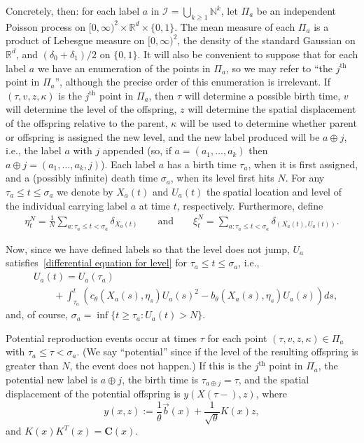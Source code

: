 \documentclass[EJP]{ejpecp} %
\newcommand{\IR}{\mathbb R}
\newcommand{\IN}{\mathbb N}
\newcommand{\meanq}{\vec b}    %
\newcommand{\covq}{\mathbf{C}}     %
\newcommand{\lp}{\xi}              %
\newcommand{\labelspace}{\mathcal{I}} %
\newcommand{\concat}{\oplus}   %
\begin{document}
Concretely, then: for each label $a$ in
$\labelspace = \bigcup_{k \ge 1} \IN^k$,
let $\Pi_a$ be an independent Poisson process on 
$[0, \infty)^2 \times \IR^d \times \{0,1\}$.
The mean measure of each $\Pi_a$ is a product of Lebesgue measure on $[0, \infty)^2$,
the density of the standard Gaussian on $\IR^d$, and 
$(\delta_0 + \delta_1)/2$ on $\{0, 1\}$.
It will also be convenient
to suppose that for each label $a$ we have an enumeration of the points in $\Pi_a$,
so we may refer to ``the $j^\text{th}$ point in $\Pi_a$'',
although the precise order of this enumeration is irrelevant.
If $(\tau, v, z, \kappa)$ is the $j^\text{th}$ point in $\Pi_a$,
then $\tau$ will determine a possible birth time,
$v$ will determine the level of the offspring,
$z$ will determine the spatial displacement of the offspring relative to the parent,
$\kappa$ will be used to determine whether parent or offspring is assigned the new level,
and the new label produced will be $a \concat j$,
i.e., the label $a$ with $j$ appended
(so, if $a = (a_1, \ldots, a_k)$ then $a \concat j = (a_1, \ldots, a_k, j)$).
Each label $a$ has a birth time $\tau_a$,
when it is first assigned,
and a (possibly infinite) death time $\sigma_a$, when its level first hits $N$.
For any $\tau_a \le t \le \sigma_a$ we denote by $X_a(t)$ and $U_a(t)$ the spatial location and level
of the individual carrying label $a$ at time $t$, respectively.
Furthermore, define
\begin{align*}
    \eta^N_t = \frac{1}{N} \sum_{a : \tau_a \le t < \sigma_a} \delta_{X_a(t)}
    \qquad \text{and} \qquad
    \lp^N_t = \sum_{a : \tau_a \le t < \sigma_a} \delta_{(X_a(t), U_a(t))} .
\end{align*}

Now, since we have defined labels so that the level does not jump,
$U_a$ satisfies~\eqref{differential equation for level}
	for $\tau_a \le t \le \sigma_a$, i.e.,
\begin{equation} \label{eqn:U_line_of_descent}
    \begin{split}
& U_a(t)
    =
    U_a(\tau_a) \\
&\qquad {}   
    + \int_{\tau_a}^{t}
    \left(
        c_\theta(X_a(s),\eta_s) U_a(s)^2
        -
        b_\theta(X_a(s),\eta_s) U_a(s)
    \right)
    ds ,
\end{split}
\end{equation}
and, of course, $\sigma_a = \inf\{t \ge \tau_a : U_a(t) > N\}$.

Potential reproduction events occur at times $\tau$
for each point $(\tau, v, z, \kappa) \in \Pi_a$ with $\tau_a \le \tau < \sigma_a$.
(We say ``potential'' since if the level of the resulting offspring is greater than $N$,
the event does not happen.)
If this is the $j^\text{th}$ point in $\Pi_a$,
the potential new label is $a \concat j$, the birth time is $\tau_{a \concat j} = \tau$,
and the spatial displacement of the potential offspring is $y(X(\tau-), z)$, where
$$
    y(x, z)
    :=
    \frac{1}{\theta}\meanq(x)
    +
    \frac{1}{\sqrt{\theta}}K(x) z,
$$
and $K(x)K^{T}(x) = \covq(x)$.
\end{document}
